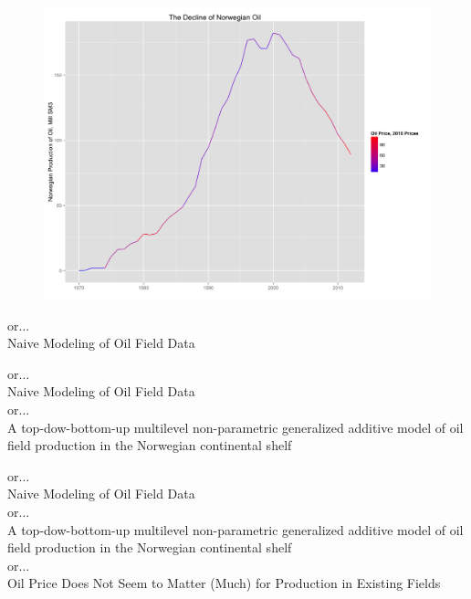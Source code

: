 \documentclass{beamer}
\begin{document}

\begin{frame}[plain]
	\begin{figure}
	\includegraphics[width=1\textwidth]{oil_decline.png}
	\end{figure}
\end{frame}


\begin{frame}[plain]
or...\\
Naive Modeling of Oil Field Data
\end{frame}

\begin{frame}[plain]
or...\\
Naive Modeling of Oil Field Data\\[1cm]
or...\\
A top-dow-bottom-up multilevel non-parametric generalized additive model of oil field production in the Norwegian continental shelf\\
\end{frame}

\begin{frame}[plain]
or...\\
Naive Modeling of Oil Field Data\\[1cm]
or...\\
A top-dow-bottom-up multilevel non-parametric generalized additive model of oil field production in the Norwegian continental shelf\\[1cm]
or...\\
Oil Price Does Not Seem to Matter (Much) for Production in Existing Fields\\
\end{frame}
\end{document}
